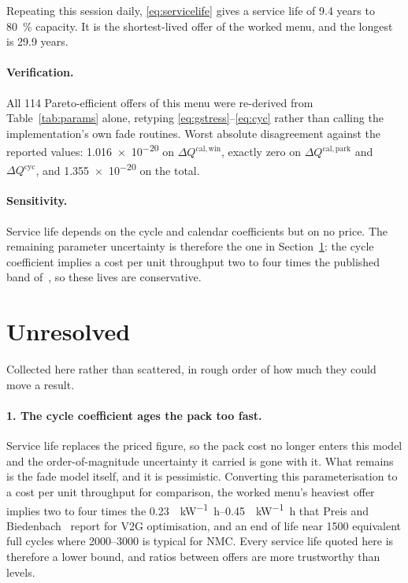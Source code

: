 \documentclass[11pt,a4paper]{article}
\newcommand{\dQ}{\Delta Q}
\begin{document}
\noindent
Repeating this session daily, \eqref{eq:servicelife} gives a service
life of \num{9.4} years to \SI{80}{\percent} capacity. It is the
shortest-lived offer of the worked menu, and the longest is
\num{29.9} years.

\paragraph{Verification.}
All \num{114} Pareto-efficient offers of this menu were re-derived from
Table~\ref{tab:params} alone, retyping \eqref{eq:gstress}--\eqref{eq:cyc}
rather than calling the implementation's own fade routines. Worst
absolute disagreement against the reported values: \num{1.016e-20} on
$\dQ^{\mathrm{cal,win}}$, exactly zero on $\dQ^{\mathrm{cal,park}}$ and
$\dQ^{\mathrm{cyc}}$, and \num{1.355e-20} on the total.

\paragraph{Sensitivity.}
Service life depends on the cycle and calendar coefficients but on no
price. The remaining parameter uncertainty is therefore the one in
Section~\ref{sec:unresolved}: the cycle coefficient implies a cost per
unit throughput two to four times the published band
of~\cite{preis2023}, so these lives are conservative.

\section{Unresolved}
\label{sec:unresolved}

Collected here rather than scattered, in rough order of how much they
could move a result.

\paragraph{1. The cycle coefficient ages the pack too fast.}
Service life replaces the priced figure, so the pack cost no longer
enters this model and the order-of-magnitude uncertainty it carried is
gone with it. What remains is the fade model itself, and it is
pessimistic. Converting this parameterisation to a cost per unit
throughput for comparison, the worked menu's heaviest offer implies
two to four times the \SIrange{0.23}{0.45}{\eurocent\per\kilo\watt\hour}
that Preis and Biedenbach~\cite{preis2023} report for V2G
optimisation, and an end of life near \num{1500} equivalent full
cycles where \numrange{2000}{3000} is typical for NMC. Every service
life quoted here is therefore a lower bound, and ratios between offers
are more trustworthy than levels.
\end{document}
